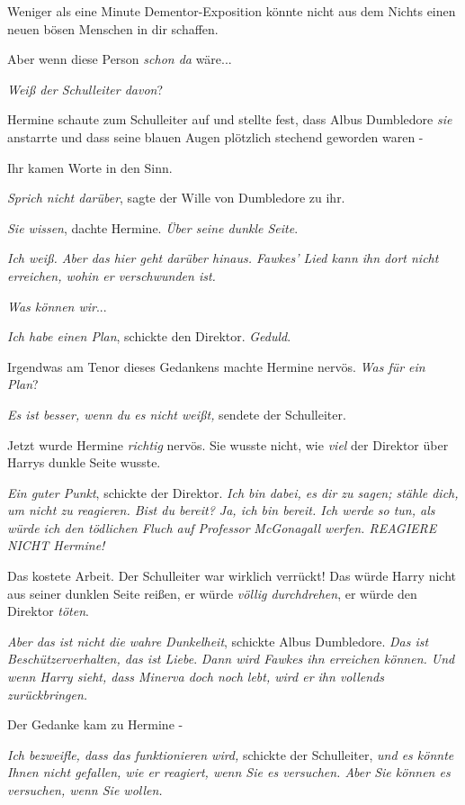 {Weniger als eine Minute Dementor-Exposition könnte nicht aus dem Nichts einen neuen bösen Menschen in dir schaffen.

Aber wenn diese Person \emph{schon da} wäre...

\emph{Weiß der Schulleiter davon}?

Hermine schaute zum Schulleiter auf und stellte fest, dass Albus Dumbledore \emph{sie} anstarrte und dass seine blauen Augen plötzlich stechend geworden waren -

Ihr kamen Worte in den Sinn.

\emph{Sprich nicht darüber}, sagte der Wille von Dumbledore zu ihr.

\emph{Sie wissen}, dachte Hermine. \emph{Über seine dunkle Seite}.

\emph{Ich weiß. Aber das hier geht darüber hinaus. Fawkes' Lied kann ihn dort nicht erreichen, wohin er verschwunden ist.}

\emph{Was können wir}...

\emph{Ich habe einen Plan}, schickte den Direktor. \emph{Geduld}.

Irgendwas am Tenor dieses Gedankens machte Hermine nervös. \emph{Was für ein Plan}?

\emph{Es ist besser, wenn du es nicht weißt,} sendete der Schulleiter.

Jetzt wurde Hermine \emph{richtig} nervös. Sie wusste nicht, wie \emph{viel} der Direktor über Harrys dunkle Seite wusste.

\emph{Ein guter Punkt}, schickte der Direktor. \emph{Ich bin dabei, es dir zu sagen; stähle dich, um nicht zu reagieren. Bist du bereit? Ja, ich bin bereit. Ich werde so tun, als würde ich den tödlichen Fluch auf Professor} \emph{McGonagall} \emph{werfen. REAGIERE NICHT Hermine!}

Das kostete Arbeit. Der Schulleiter war wirklich verrückt! Das würde Harry nicht aus seiner dunklen Seite reißen, er würde \emph{völlig durchdrehen}, er würde den Direktor \emph{töten}.

\emph{Aber das ist nicht die wahre Dunkelheit}, schickte Albus Dumbledore. \emph{Das ist Beschützerverhalten, das ist Liebe}. \emph{Dann wird Fawkes ihn erreichen können. Und wenn Harry sieht, dass Minerva doch noch lebt, wird er ihn vollends zurückbringen.}

Der Gedanke kam zu Hermine -

\emph{Ich bezweifle, dass das funktionieren wird,} schickte der Schulleiter, \emph{und es könnte Ihnen nicht gefallen, wie er reagiert, wenn Sie es versuchen. Aber Sie können es versuchen, wenn Sie wollen.}

}
